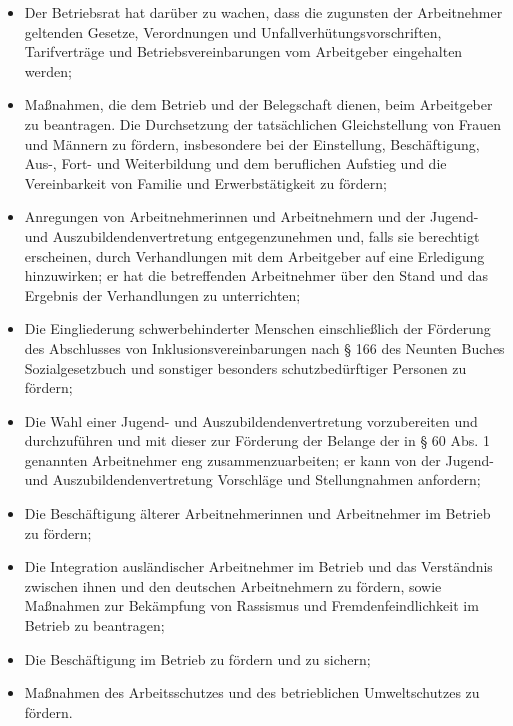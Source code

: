 \begin{itemize}
	\item 
	Der Betriebsrat hat darüber zu wachen, dass die zugunsten der Arbeitnehmer geltenden Gesetze, Verordnungen und Unfallverhütungsvorschriften, Tarifverträge und Betriebsvereinbarungen vom Arbeitgeber eingehalten werden;
	\item
	Maßnahmen, die dem Betrieb und der Belegschaft dienen, beim Arbeitgeber zu beantragen. Die Durchsetzung der tatsächlichen Gleichstellung von Frauen und Männern zu fördern, insbesondere bei der Einstellung, Beschäftigung, Aus-, Fort- und Weiterbildung und dem beruflichen Aufstieg und die Vereinbarkeit von Familie und Erwerbstätigkeit zu fördern;
	\item 
	Anregungen von Arbeitnehmerinnen und Arbeitnehmern und der Jugend- und Auszubildendenvertretung entgegenzunehmen und, falls sie berechtigt erscheinen, durch Verhandlungen mit dem Arbeitgeber auf eine Erledigung hinzuwirken; er hat die betreffenden Arbeitnehmer über den Stand und das Ergebnis der Verhandlungen zu unterrichten;
	\item
	Die Eingliederung schwerbehinderter Menschen einschließlich der Förderung des Abschlusses von Inklusionsvereinbarungen nach § 166 des Neunten Buches Sozialgesetzbuch und sonstiger besonders schutzbedürftiger Personen zu fördern;
	\item
	Die Wahl einer Jugend- und Auszubildendenvertretung vorzubereiten und durchzuführen und mit dieser zur Förderung der Belange der in § 60 Abs. 1 genannten Arbeitnehmer eng zusammenzuarbeiten; er kann von der Jugend- und Auszubildendenvertretung Vorschläge und Stellungnahmen anfordern;
	\item
	Die Beschäftigung älterer Arbeitnehmerinnen und Arbeitnehmer im Betrieb zu fördern;
	\item
	Die Integration ausländischer Arbeitnehmer im Betrieb und das Verständnis zwischen ihnen und den deutschen Arbeitnehmern zu fördern, sowie Maßnahmen zur Bekämpfung von Rassismus und Fremdenfeindlichkeit im Betrieb zu beantragen;
	\item
	Die Beschäftigung im Betrieb zu fördern und zu sichern;
	\item
	Maßnahmen des Arbeitsschutzes und des betrieblichen Umweltschutzes zu fördern.
\end{itemize}

